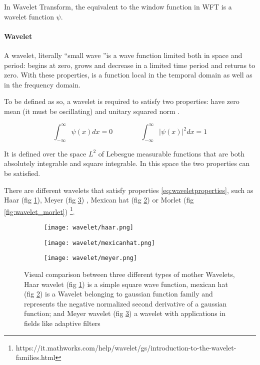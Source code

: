 \documentclass[10pt]{report}
\begin{document}
In Wavelet Transform, the equivalent to the window function in WFT is a wavelet function $\psi$.

\paragraph{Wavelet} \hfill

A wavelet, literally \textquotedblleft small wave \textquotedblright is a wave function limited both in space and period: begins at zero, grows and decrease in a limited time period and returns to zero. With these properties, is a function local in the temporal domain as well as in the frequency domain.

To be defined as so, a wavelet is required to satisfy two properties: have zero mean (it must be oscillating) and unitary squared norm \cite{percival-2013}.

\begin{equation}\label{eq:waveletproperties}
\int_{-\infty}^{\infty}\psi(x)dx = 0 \qquad \qquad  \int_{-\infty}^{\infty} |\psi(x)|^2 dx = 1
\end{equation}

It is defined over the space $L^2$ of Lebesgue measurable functions that are both absolutely integrable and square integrable. In this space the two properties can be satisfied.

There are different wavelets that satisfy properties \ref{eq:waveletproperties}, such as Haar (fig \ref{fig:wavelet_haar}), Meyer (fig \ref{fig:wavelet_meyer}) \cite{dabauchies-1992}, Mexican hat (fig \ref{fig:wavelet_mexicanhat}) or Morlet (fig \ref{fig:wavelet_morlet}) \footnote{https://it.mathworks.com/help/wavelet/gs/introduction-to-the-wavelet-families.html}.



\begin{figure}
\begin{subfigure}{0.3\textwidth}
\texttt{[image: wavelet/haar.png]}
\caption{}
\label{fig:wavelet_haar}
\end{subfigure}
\begin{subfigure}{0.3\textwidth}
\texttt{[image: wavelet/mexicanhat.png]}
\caption{}
\label{fig:wavelet_mexicanhat}
\end{subfigure}
\begin{subfigure}{0.3\textwidth}
\texttt{[image: wavelet/meyer.png]}
\caption{}
\label{fig:wavelet_meyer}
\end{subfigure}
\caption{Visual comparison between three different types of mother Wavelets, Haar wavelet (fig \ref{fig:wavelet_haar}) is a simple square wave function, mexican hat (fig \ref{fig:wavelet_mexicanhat}) is a Wavelet belonging to gaussian function family and represents the negative normalized second derivative of a gaussian function; and Meyer wavelet (fig \ref{fig:wavelet_meyer}) a wavelet with applications in fields like adaptive filters}
\label{fig:different_wavelets}
\end{figure}
\end{document}
